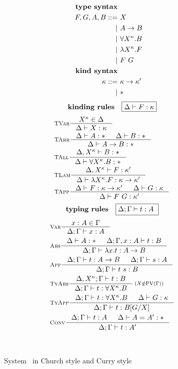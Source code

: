 \begin{figure}
\begin{singlespace}
\begin{minipage}{.46\textwidth}
\begin{align*}
\textbf{type syntax} \\
F,G,A,B ::= &~ X                  \\
          | &~ A -> B             \\
          | &~ \forall X^\kappa.B \\
          | &~ \lambda X^\kappa.F      \\
          | &~ F ~ G              \\
\textbf{kind syntax} \\
\kappa ::= &~ \kappa -> \kappa' \\
         | &~ *                 \\
\end{align*}
\[ \textbf{kinding rules} \quad \framebox{$ \Delta |- F:\kappa$}\]\vspace*{-1em}
\begin{align*}
& \inference[\sc TVar]{X^\kappa \in \Delta}{\Delta |- X:\kappa} \\
& \inference[\sc TArr]{\Delta |- A:* & \Delta |- B:*}{\Delta |- A -> B:*} \\
& \inference[\sc TAll]{\Delta,X^\kappa |- B:*}{\Delta |- \forall X^\kappa.B:*} \\
& \inference[\sc TLam]{\Delta,X^\kappa |- F:\kappa'}
                      {\Delta |- \l X^\kappa.F:\kappa -> \kappa'} \\
& \inference[\sc TApp]{\Delta |- F : \kappa -> \kappa' & \Delta |- G : \kappa}
                      {\Delta |- F ~ G : \kappa'} \\
\end{align*}
\[ \textbf{typing rules} \quad \framebox{$ \Delta;\Gamma |- t : A $ } \]
\vspace*{-1em}
\begin{align*}
& \inference[\sc Var]{x:A \in \Gamma}{\Delta;\Gamma |- x:A} \\
& \inference[\sc Abs]{\Delta |- A:* & \Delta;\Gamma,x:A |- t : B}
                     {\Delta;\Gamma |- \l x   .t : A -> B} \\
& \inference[\sc App]{\Delta;\Gamma |- t : A -> B & \Delta;\Gamma |- s : A}
                     {\Delta;\Gamma |- t~s : B} \\
& \inference[\sc TyAbs]{\Delta,X^\kappa;\Gamma |- t : B}
                       {\Delta;\Gamma |- t : \forall X^\kappa.B}
	 \begin{smallmatrix}(X\notin\FV(\Gamma))\end{smallmatrix} \\
& \inference[\sc TyApp]{\Delta;\Gamma |- t : \forall X^\kappa.B & \Delta |- G:\kappa}
                       {\Delta;\Gamma |- t : B[G/X]} \\
& \inference[\sc Conv]{\Delta;\Gamma |- t : A & \Delta |- A = A' : *}
                      {\Delta;\Gamma |- t : A'}
\end{align*}
\end{minipage}
~\\
\caption{System \Fw\ in Church style and Curry style}
\label{fig:fw}
\end{singlespace}
\end{figure}

